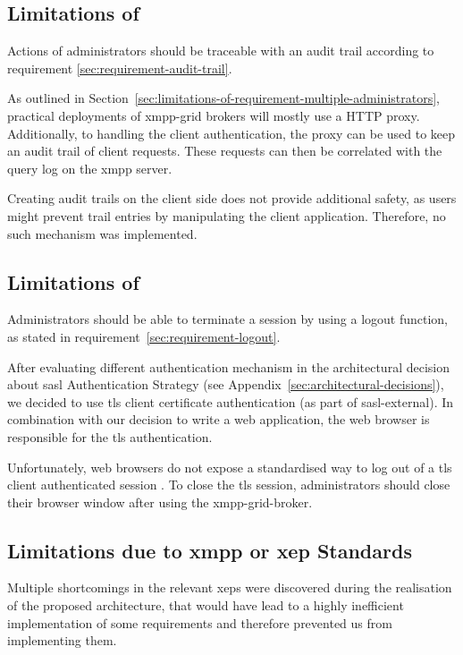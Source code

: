 \subsection{Limitations of \emph{}}

Actions of administrators should be traceable with an audit trail according to requirement \ref{sec:requirement-audit-trail}.

As outlined in Section~\ref{sec:limitations-of-requirement-multiple-administrators}, practical deployments of \gls{xmpp-grid} \glspl{broker} will mostly use a HTTP proxy.
Additionally, to handling the client authentication, the proxy can be used to keep an audit trail of client requests.
These requests can then be correlated with the query log on the \gls{xmpp} server.

Creating audit trails on the client side does not provide additional safety, as users might prevent trail entries by manipulating the client application.
Therefore, no such mechanism was implemented.

\subsection{Limitations of \emph{}}

Administrators should be able to terminate a session by using a logout function, as stated in requirement~\ref{sec:requirement-logout}.

After evaluating different authentication mechanism in the architectural decision about \gls{sasl} Authentication Strategy (see Appendix~\ref{sec:architectural-decisions}), we decided to use \gls{tls} client certificate authentication (as part of \gls{sasl-external}). In combination with our decision to write a web application, the web browser is responsible for the \gls{tls} authentication.

Unfortunately, web browsers do not expose a standardised way to log out of a \gls{tls} client authenticated session \cite{practical-issues-with-tls-client}.
To close the \gls{tls} session, administrators should close their browser window after using the \gls{xmpp-grid-broker}.

\subsection{Limitations due to \gls{xmpp} or \gls{xep} Standards}

Multiple shortcomings in the relevant \glspl{xep} were discovered during the realisation of the proposed architecture, that would have lead to a highly inefficient implementation of some requirements and therefore prevented us from implementing them.

